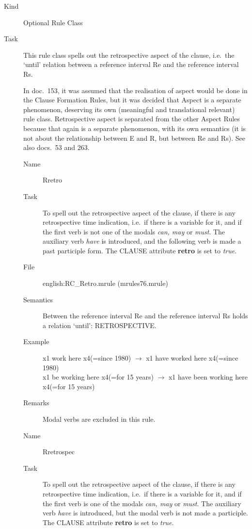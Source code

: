\begin{description}
\item[Kind] Optional Rule Class
\item[Task] This rule class spells out the retrospective aspect of the clause, 
i.e.\  the `until' relation between a reference interval Re and the reference 
interval Rs.

In doc.\ 153, it was assumed that the realisation of aspect would be done in 
the Clause Formation Rules, but it was decided that Aspect is a separate 
phenomenon, deserving its own (meaningful and translational relevant) rule 
class. Retrospective aspect is separated from the other Aspect Rules because 
that again is a separate phenomenon, with its own semantics (it is not about 
the relationship between E and R, but between Re and Rs).
See also docs.\ 53 and 263.
\vspace{1 cm}
\begin{description}
\item[Name] Rretro
\item[Task] To spell out the retrospective aspect of the clause, if there is 
any retrospective time indication, i.e.\ if there is a variable for it, and if 
the first verb is not one of the modals {\em can, may\/} or {\em must\/}.
The auxiliary verb {
\em have\/} is introduced, and the following verb is made a past participle
form. The 
CLAUSE attribute {\bf retro} is set to {\em true\/}.
\item[File] english:RC\_Retro.mrule (mrules76.mrule)
\item[Semantics] Between the reference interval Re and the reference interval 
Rs holds a relation `until': RETROSPECTIVE.
\item[Example] x1 work here x4(=since 1980) $\rightarrow$ x1 have worked here
x4(=since  1980)\\
x1 be working here x4(=for 15 years) $\rightarrow$ x1 have been working here
x4(=for 15 years)
\item[Remarks] Modal verbs are excluded in this rule.
\end{description}

\vspace{1 cm}
\begin{description}
\item[Name] Rretrospec 
\item[Task] To spell out the retrospective aspect of the clause, if there is 
any retrospective time indication, i.e.\ if there is a variable for it,
and if the first verb is one of the modals {\em can, may\/} or {\em must\/}.
The auxiliary verb {\em have\/} is introduced, 
but the modal verb is not made a participle. The 
CLAUSE attribute {\bf retro} is set to {\em true\/}.



\end{description}
\end{description}
